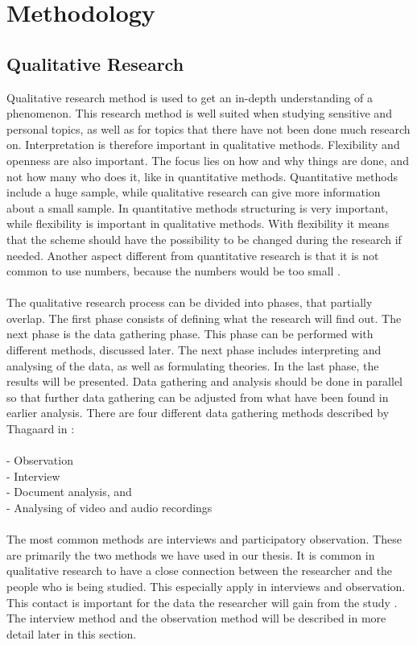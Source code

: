 \chapter{Methodology}
\section{Qualitative Research}
Qualitative research method is used to get an in-depth understanding of a phenomenon. This research method is well suited when studying sensitive and personal topics, as well as for topics that there have not been done much research on. Interpretation is therefore important in qualitative methods. Flexibility and openness are also important.  The focus lies on how and why things are done, and not how many who does it, like in quantitative methods. Quantitative methods include a huge sample, while qualitative research can give more information about a small sample. In quantitative methods structuring is very important, while flexibility is important in qualitative methods. With flexibility it means that the scheme should have the possibility to be changed during the research if needed. Another aspect different from quantitative research is that it is not common to use numbers, because the numbers would be too small \cite{qualitative}. \\ \\
The qualitative research process can be divided into phases, that partially overlap. The first phase consists of defining what the research will find out. The next phase is the data gathering phase. This phase can be performed with different methods, discussed later. The next phase includes interpreting and analysing of the data, as well as formulating theories. In the last phase, the results will be presented. Data gathering and analysis should be done in parallel so that further data gathering can be adjusted from what have been found in earlier analysis. There are four different data gathering methods described by Thagaard in \cite{qualitative}: \\ \\
- Observation \\
- Interview \\ 
- Document analysis, and \\
- Analysing of video and audio recordings \\ \\
The most common methods are interviews and participatory observation. These are primarily the two methods we have used in our thesis. It is common in qualitative research to have a close connection between the researcher and the people who is being studied. This especially apply in interviews and observation. This contact is important for the data the researcher will gain from the study \cite{qualitative}. The interview method and the observation method will be described in more detail later in this section. \\ \\
